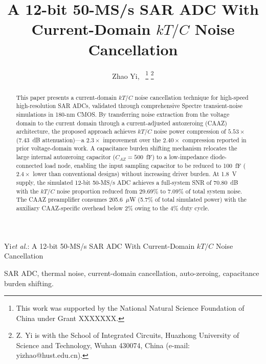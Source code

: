 \documentclass[journal]{IEEEtran}
\begin{document}
\title{A 12-bit 50-MS/s SAR ADC With Current-Domain $kT/C$ Noise Cancellation}

\author{Zhao Yi,~
\thanks{This work was supported by the National Natural Science Foundation of China under Grant XXXXXXX.}
\thanks{Z. Yi is with the School of Integrated Circuits, Huazhong University of Science and Technology, Wuhan 430074, China (e-mail: yizhao@hust.edu.cn).}}

%
{Yi\MakeLowercase{\textit{et al.}}: A 12-bit 50-MS/s SAR ADC With Current-Domain $kT/C$ Noise Cancellation}


\maketitle

\begin{abstract}
This paper presents a current-domain $kT/C$ noise cancellation technique for high-speed high-resolution SAR ADCs, validated through comprehensive Spectre transient-noise simulations in 180-nm CMOS. By transferring noise extraction from the voltage domain to the current domain through a current-adjusted autozeroing (CAAZ) architecture, the proposed approach achieves $kT/C$ noise power compression of $5.53\times$ (7.43~dB attenuation)---a $2.3\times$ improvement over the $2.40\times$ compression reported in prior voltage-domain work. A capacitance burden shifting mechanism relocates the large internal autozeroing capacitor ($C_{AZ}=500$~fF) to a low-impedance diode-connected load node, enabling the input sampling capacitor to be reduced to 100~fF ($2.4\times$ lower than conventional designs) without increasing driver burden. At 1.8~V supply, the simulated 12-bit 50-MS/s ADC achieves a full-system SNR of 70.80~dB with the $kT/C$ noise proportion reduced from 29.69\% to 7.09\% of total system noise. The CAAZ preamplifier consumes 205.6~$\mu$W (5.7\% of total simulated power) with the auxiliary CAAZ-specific overhead below 2\% owing to the 4\% duty cycle.
\end{abstract}

\begin{IEEEkeywords}
SAR ADC, thermal noise, current-domain cancellation, auto-zeroing, capacitance burden shifting.
\end{IEEEkeywords}
\end{document}
